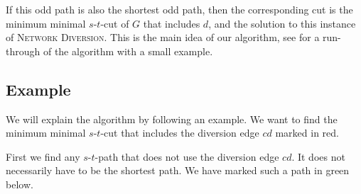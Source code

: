If this odd path is also the shortest odd path, then the corresponding cut is the minimum minimal $s$-$t$-cut of $G$ that includes $d$, and the solution to this instance of \textsc{Network Diversion}. This is the main idea of our algorithm, see  for a run-through of the algorithm with a small example.

\subsection{Example}
\label{subsection:network-diversion-example}
We will explain the algorithm by following an example. We want to find the minimum minimal $s$-$t$-cut that includes the diversion edge $cd$ marked in red. 

\begin{center}
\end{center}

First we find any $s$-$t$-path that does not use the diversion edge $cd$. It does not necessarily have to be the shortest path. We have marked such a path in green below.

